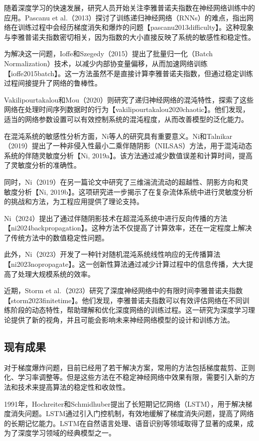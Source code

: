 \documentclass[12pt,a4paper]{amsart}
\begin{document}
随着深度学习的快速发展，研究人员开始关注李雅普诺夫指数在神经网络训练中的应用。Pascanu et al.（2013）探讨了训练递归神经网络（RNNs）的难点，指出网络在训练过程中会经历梯度消失和爆炸的问题【pascanu2013difficulty】。这种现象与李雅普诺夫指数密切相关，因为指数的大小直接反映了系统的敏感性和稳定性。

为解决这一问题，Ioffe和Szegedy（2015）提出了批量归一化（Batch Normalization）技术，以减少内部协变量偏移，从而加速网络训练【ioffe2015batch】。这一方法虽然不是直接计算李雅普诺夫指数，但通过稳定训练过程间接提升了网络的鲁棒性。

Vakilipourtakalou和Mou（2020）则研究了递归神经网络的混沌特性，探索了这些网络在处理时间序列数据时的行为【vakilipourtakalou2020chaotic】。他们发现，适当的网络参数设置可以有效控制系统的混沌程度，从而改善模型的泛化能力。

在混沌系统的敏感性分析方面，Ni等人的研究具有重要意义。Ni和Talnikar（2019）提出了一种非侵入性最小二乘伴随阴影（NILSAS）方法，用于混沌动态系统的伴随灵敏度分析【Ni, 2019a】。该方法通过减少数值误差和计算时间，提高了灵敏度分析的准确性。

同时，Ni（2019）在另一篇论文中研究了三维湍流流动的超越性、阴影方向和灵敏度分析【Ni, 2019b】。这项研究进一步揭示了在复杂流体系统中进行灵敏度分析的挑战和方法，为工程应用提供了理论支持。

Ni（2024）提出了通过伴随阴影技术在超混沌系统中进行反向传播的方法【ni2024backpropagation】。这种方法不仅提高了计算效率，还在一定程度上解决了传统方法中的数值稳定性问题。

此外，Ni（2023）开发了一种针对随机混沌系统线性响应的无传播算法【ni2023nopropagate】。这一创新性算法通过减少计算过程中的信息传播，大大提高了处理大规模系统的效率。

近期，Storm et al.（2023）研究了深度神经网络中的有限时间李雅普诺夫指数【storm2023finitetime】。他们发现，李雅普诺夫指数可以有效评估网络在不同训练阶段的动态特性，帮助理解和优化深度网络的训练过程。这一研究为深度学习理论提供了新的视角，并且可能会影响未来神经网络模型的设计和训练方法。

\subsection{现有成果}

对于梯度爆炸问题，目前已经用了若干解决方案，常用的方法包括梯度裁剪、正则化、学习率调整等。但是这些方法在不稳定神经网络中效果有限，需要引入新的方法和技术来提高算法的稳定性和收敛性。

1991年，Hochreiter和Schmidhuber提出了长短期记忆网络（LSTM），用于解决梯度消失问题。LSTM通过引入门控机制，有效地缓解了梯度消失问题，提高了网络的长期记忆能力。LSTM在自然语言处理、语音识别等领域取得了显著的成果，成为了深度学习领域的经典模型之一。
\end{document}
